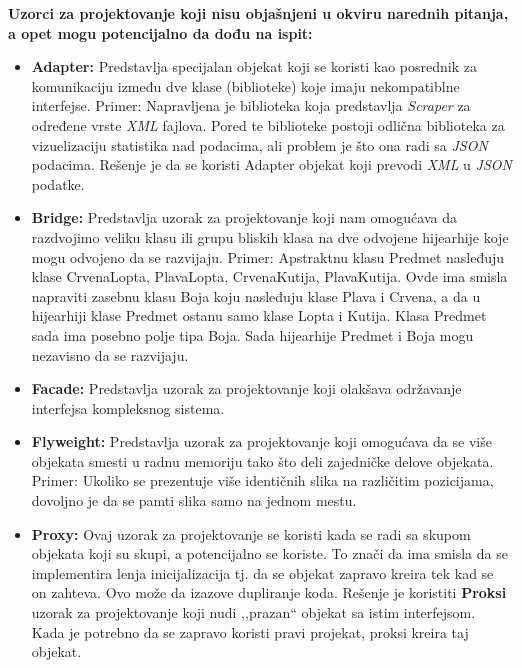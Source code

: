 \documentclass[a4paper]{article}
\begin{document}
  \textbf{Uzorci za projektovanje koji nisu objašnjeni u okviru narednih pitanja, a opet mogu potencijalno da
          dođu na ispit:}
  \begin{itemize}
    \item \textbf{Adapter:} Predstavlja specijalan objekat koji se koristi kao posrednik 
          za komunikaciju između dve klase (biblioteke) koje 
          imaju nekompatiblne interfejse. Primer: Napravljena
          je biblioteka koja predstavlja \textit{Scraper} za određene vrste \textit{XML} fajlova. Pored te biblioteke 
          postoji odlična biblioteka za vizuelizaciju statistika nad podacima, ali problem je što ona radi sa 
          \textit{JSON} podacima. Rešenje je da se koristi Adapter objekat koji prevodi \textit{XML} u \textit{JSON}
          podatke.
    \item \textbf{Bridge:} Predstavlja uzorak za projektovanje koji nam omogućava da razdvojimo veliku klasu
          ili grupu bliskih klasa na dve odvojene hijearhije koje mogu odvojeno da se razvijaju. Primer:
          Apstraktnu klasu Predmet nasleđuju klase CrvenaLopta, PlavaLopta, CrvenaKutija, PlavaKutija. Ovde ima 
          smisla napraviti zasebnu klasu Boja koju nasleđuju klase Plava i Crvena, a da u hijearhiji klase Predmet
          ostanu samo klase Lopta i Kutija. Klasa Predmet sada ima posebno polje tipa Boja. Sada hijearhije 
          Predmet i Boja mogu nezavisno da se razvijaju.
    \item \textbf{Facade:} Predstavlja uzorak za projektovanje koji olakšava održavanje interfejsa kompleksnog sistema.
    \item \textbf{Flyweight:} Predstavlja uzorak za projektovanje koji omogućava da se više objekata smesti u radnu 
          memoriju tako što deli zajedničke delove objekata. Primer: Ukoliko se prezentuje više identičnih slika
          na različitim pozicijama, dovoljno je da se pamti slika samo na jednom mestu.
    \item \textbf{Proxy:} Ovaj uzorak za projektovanje se koristi kada se radi sa skupom objekata koji su skupi,
          a potencijalno se koriste. To znači da ima smisla da se implementira lenja inicijalizacija tj. 
          da se objekat zapravo kreira tek kad se on zahteva. Ovo može da izazove dupliranje koda. Rešenje je 
          koristiti \textbf{Proksi} uzorak za projektovanje koji nudi ,,prazan`` objekat sa istim interfejsom.
          Kada je potrebno da se zapravo koristi pravi projekat, proksi kreira taj objekat.
  \end{itemize}
\end{document}

